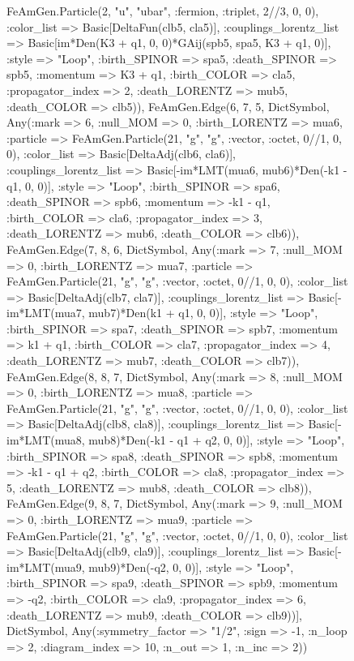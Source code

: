 \documentclass{revtex4}
\begin{document}
\begin{figure}[!htb]
\begin{center}
{FeAmGen.Particle(2, "u", "ubar", :fermion, :triplet, 2//3, 0, 0), :color_list => Basic[DeltaFun(clb5, cla5)], :couplings_lorentz_list => Basic[im*Den(K3 + q1, 0, 0)*GAij(spb5, spa5, K3 + q1, 0)], :style => "Loop", :birth_SPINOR => spa5, :death_SPINOR => spb5, :momentum => K3 + q1, :birth_COLOR => cla5, :propagator_index => 2, :death_LORENTZ => mub5, :death_COLOR => clb5)), FeAmGen.Edge(6, 7, 5, Dict{Symbol, Any}(:mark => 6, :null_MOM => 0, :birth_LORENTZ => mua6, :particle => FeAmGen.Particle(21, "g", "g", :vector, :octet, 0//1, 0, 0), :color_list => Basic[DeltaAdj(clb6, cla6)], :couplings_lorentz_list => Basic[-im*LMT(mua6, mub6)*Den(-k1 - q1, 0, 0)], :style => "Loop", :birth_SPINOR => spa6, :death_SPINOR => spb6, :momentum => -k1 - q1, :birth_COLOR => cla6, :propagator_index => 3, :death_LORENTZ => mub6, :death_COLOR => clb6)), FeAmGen.Edge(7, 8, 6, Dict{Symbol, Any}(:mark => 7, :null_MOM => 0, :birth_LORENTZ => mua7, :particle => FeAmGen.Particle(21, "g", "g", :vector, :octet, 0//1, 0, 0), :color_list => Basic[DeltaAdj(clb7, cla7)], :couplings_lorentz_list => Basic[-im*LMT(mua7, mub7)*Den(k1 + q1, 0, 0)], :style => "Loop", :birth_SPINOR => spa7, :death_SPINOR => spb7, :momentum => k1 + q1, :birth_COLOR => cla7, :propagator_index => 4, :death_LORENTZ => mub7, :death_COLOR => clb7)), FeAmGen.Edge(8, 8, 7, Dict{Symbol, Any}(:mark => 8, :null_MOM => 0, :birth_LORENTZ => mua8, :particle => FeAmGen.Particle(21, "g", "g", :vector, :octet, 0//1, 0, 0), :color_list => Basic[DeltaAdj(clb8, cla8)], :couplings_lorentz_list => Basic[-im*LMT(mua8, mub8)*Den(-k1 - q1 + q2, 0, 0)], :style => "Loop", :birth_SPINOR => spa8, :death_SPINOR => spb8, :momentum => -k1 - q1 + q2, :birth_COLOR => cla8, :propagator_index => 5, :death_LORENTZ => mub8, :death_COLOR => clb8)), FeAmGen.Edge(9, 8, 7, Dict{Symbol, Any}(:mark => 9, :null_MOM => 0, :birth_LORENTZ => mua9, :particle => FeAmGen.Particle(21, "g", "g", :vector, :octet, 0//1, 0, 0), :color_list => Basic[DeltaAdj(clb9, cla9)], :couplings_lorentz_list => Basic[-im*LMT(mua9, mub9)*Den(-q2, 0, 0)], :style => "Loop", :birth_SPINOR => spa9, :death_SPINOR => spb9, :momentum => -q2, :birth_COLOR => cla9, :propagator_index => 6, :death_LORENTZ => mub9, :death_COLOR => clb9))], Dict{Symbol, Any}(:symmetry_factor => "1/2", :sign => -1, :n_loop => 2, :diagram_index => 10, :n_out => 1, :n_inc => 2)) 
}
\end{center}
\end{figure}
\end{document}
